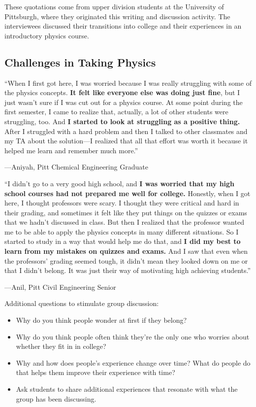 \documentclass[]{article}
\begin{document}
\newpage
\begin{TeacherMargin}
These quotations come from upper division students at the University of Pittsburgh, where they originated this writing and discussion activity. The interviewees discussed their transitions into college and their experiences in an introductory physics course.
\end{TeacherMargin}
\begin{PresentSpace}
\section*{Challenges in Taking Physics}
``When I first got here, I was worried because I was really
struggling with some of the physics concepts. \textbf{It felt like
everyone else was doing just fine}, but I just wasn’t sure
if I was cut out for a physics course. At some point during
the first semester, I came to realize that, actually, a lot of
other students were struggling, too. And \textbf{I started to look
at struggling as a positive thing.} After I struggled with a
hard problem and then I talked to other classmates and
my TA about the solution—I realized that all that effort was
worth it because it helped me learn and remember much
more.''
\begin{flushright}
---Aniyah, Pitt Chemical Engineering Graduate
\end{flushright}
``I didn’t go to a very good high school, and \textbf{I was worried that
my high school courses had not prepared me well for
college.} Honestly, when I got here, I thought professors were
scary. I thought they were critical and hard in their grading, and
sometimes it felt like they put things on the quizzes or exams
that we hadn't discussed in class. But then I realized that the
professor wanted me to be able to apply the physics concepts
in many different situations. So I started to study in a way that
would help me do that, and \textbf{I did my best to learn from my
mistakes on quizzes and exams.} And I saw that even when
the professors' grading seemed tough, it didn’t mean they
looked down on me or that I didn’t belong. It was just their way
of motivating high achieving students.''
\begin{flushright}
---Anil, Pitt Civil Engineering Senior
\end{flushright}
\end{PresentSpace}
\newpage
\begin{TeacherMargin}
Additional questions to stimulate group discussion:
\begin{itemize}
	\item Why do you think people wonder at first if they belong?
	\item Why do you think people often think they're the only one who worries about whether they fit in in college?
	\item Why and how does people's experience change over time? What do people do that helps them improve their experience with time?
	\item Ask students to share additional experiences that resonate with what the group has been discussing.
\end{itemize}
\end{TeacherMargin}
\end{document}
